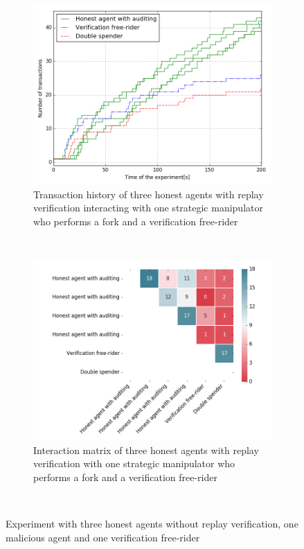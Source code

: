 \begin{figure}[h!]
    \begin{subfigure}{\textwidth}
      \centering
      \includegraphics[width=.7\linewidth]{images/verification_doublespending}
      \caption{Transaction history of three honest agents with replay verification interacting with one strategic manipulator who performs a fork and a verification free-rider}
      \label{fig:verification_doublespending}
    \end{subfigure}\\
    \begin{subfigure}{\textwidth}
      \centering
      \includegraphics[width=.9\linewidth]{images/verification_doublespending_matrix}
      \caption{Interaction matrix of three honest agents with replay verification with one strategic manipulator who performs a fork and a verification free-rider}
      \label{fig:verification_doublespending_matrix}
    \end{subfigure}\\
    \caption{Experiment with three honest agents without replay verification, one malicious agent 
    and one verification free-rider}
    \label{fig:verification_doublespend_combined}
\end{figure}

